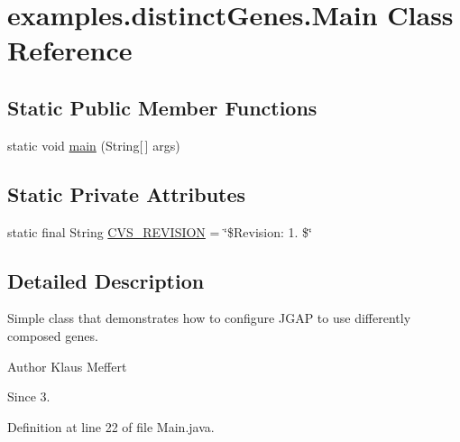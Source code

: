 \hypertarget{classexamples_1_1distinct_genes_1_1_main}{\section{examples.\-distinct\-Genes.\-Main Class Reference}
\label{classexamples_1_1distinct_genes_1_1_main}
}
\subsection*{Static Public Member Functions}
\begin{DoxyCompactItemize}
\item 
static void \hyperlink{classexamples_1_1distinct_genes_1_1_main_a0f8f9822588a8b7f1b06bcc6d51c688f}{main} (String\mbox{[}$\,$\mbox{]} args)
\end{DoxyCompactItemize}
\subsection*{Static Private Attributes}
\begin{DoxyCompactItemize}
\item 
static final String \hyperlink{classexamples_1_1distinct_genes_1_1_main_a3bd518bb5f3a0023360c3a7efecd614b}{C\-V\-S\-\_\-\-R\-E\-V\-I\-S\-I\-O\-N} = \char`\"{}\$Revision\-: 1. \$\char`\"{}
\end{DoxyCompactItemize}


\subsection{Detailed Description}
Simple class that demonstrates how to configure J\-G\-A\-P to use differently composed genes.

\begin{DoxyAuthor}{Author}
Klaus Meffert 
\end{DoxyAuthor}
\begin{DoxySince}{Since}
3. 
\end{DoxySince}


Definition at line 22 of file Main.\-java.



